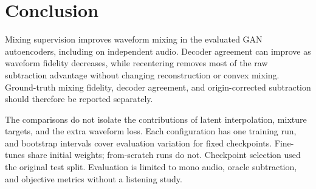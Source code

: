 \documentclass[conference]{IEEEtran}
\begin{document}
\section{Conclusion}\label{sec:conclusion}
Mixing supervision improves waveform mixing in the evaluated GAN
autoencoders, including on independent audio. Decoder agreement can improve
as waveform fidelity decreases, while recentering removes most of the raw
subtraction advantage without changing reconstruction or convex mixing.
Ground-truth mixing fidelity, decoder agreement, and origin-corrected
subtraction should therefore be reported separately.

The comparisons do not isolate the contributions of latent interpolation,
mixture targets, and the extra waveform loss. Each configuration has one
training run, and bootstrap intervals cover evaluation variation for fixed
checkpoints. Fine-tunes share initial weights; from-scratch runs do not.
Checkpoint selection used the original test split. Evaluation is limited to
mono audio, oracle subtraction, and objective metrics without a listening study.

\clearpage


\end{document}

